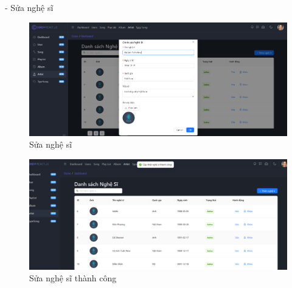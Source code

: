 - Sửa nghệ sĩ
\begin{figure}[H]
    \centering
    \includegraphics[width=1\textwidth]{imgs/chap5/ql_nghe_si_4.png}
    \caption{Sửa nghệ sĩ}
\end{figure}
\begin{figure}[H]
    \centering
    \includegraphics[width=1\textwidth]{imgs/chap5/ql_nghe_si_5.png}
    \caption{Sửa nghệ sĩ thành công}
\end{figure}

